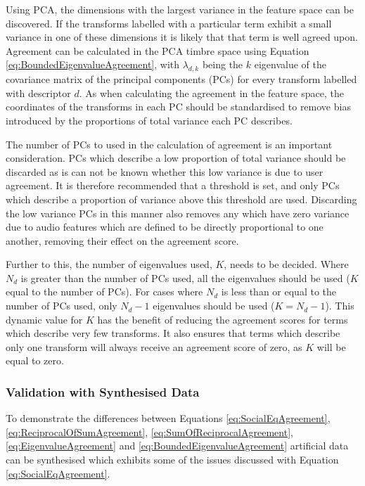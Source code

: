 			Using PCA, the dimensions with the largest variance in the feature space can be discovered. If the
			transforms labelled with a particular term exhibit a small variance in one of these dimensions it
			is likely that that term is well agreed upon. Agreement can be calculated in the PCA timbre space
			using Equation \ref{eq:BoundedEigenvalueAgreement}, with $\lambda_{d,k}$ being the $k$
			eigenvalue of the covariance matrix of the principal components (PCs) for every transform labelled
			with descriptor $d$. As when calculating the agreement in the feature space, the coordinates of the
			transforms in each PC should be standardised to remove bias introduced by the proportions of total
			variance each PC describes.

			The number of PCs to used in the calculation of agreement is an important consideration. PCs which
			describe a low proportion of total variance should be discarded as is can not be known whether this
			low variance is due to user agreement. It is therefore recommended that a threshold is set, and
			only PCs which describe a proportion of variance above this threshold are used. Discarding the low
			variance PCs in this manner also removes any which have zero variance due to audio features
			which are defined to be directly proportional to one another, removing their effect on the
			agreement score.

			Further to this, the number of eigenvalues used, $K$, needs to be decided. Where $N_{d}$ is greater
			than the number of PCs used, all the eigenvalues should be used ($K$ equal to the number of PCs).
			For cases where $N_{d}$ is less than or equal to the number of PCs used, only $N_{d} - 1$
			eigenvalues should be used ($K = N_{d} - 1$). This dynamic value for $K$ has the benefit of
			reducing the agreement scores for terms which describe very few transforms. It also ensures that
			terms which describe only one transform will always receive an agreement score of zero, as $K$ will
			be equal to zero.

		\subsubsection*{Validation with Synthesised Data}
			To demonstrate the differences between Equations \ref{eq:SocialEqAgreement},
			\ref{eq:ReciprocalOfSumAgreement}, \ref{eq:SumOfReciprocalAgreement}, \ref{eq:EigenvalueAgreement}
			and \ref{eq:BoundedEigenvalueAgreement} artificial data can be synthesised which exhibits some of
			the issues discussed with Equation \ref{eq:SocialEqAgreement}.
			
